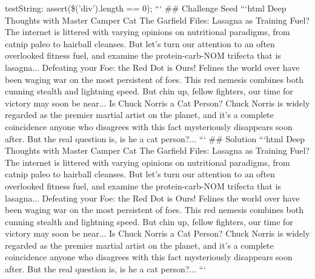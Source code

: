 \documentclass{article}%
\begin{document}
    testString: assert(\$('div').length == 0);\newline%
```\newline%
\#\# Challenge Seed\newline%
```html\newline%
Deep Thoughts with Master Camper Cat\newline%
The Garfield Files: Lasagna as Training Fuel?\newline%
The internet is littered with varying opinions on nutritional paradigms, from catnip paleo to hairball cleanses. But let's turn our attention to an often overlooked fitness fuel, and examine the protein{-}carb{-}NOM trifecta that is lasagna...\newline%
Defeating your Foe: the Red Dot is Ours!\newline%
Felines the world over have been waging war on the most persistent of foes. This red nemesis combines both cunning stealth and lightning speed. But chin up, fellow fighters, our time for victory may soon be near...\newline%
Is Chuck Norris a Cat Person?\newline%
Chuck Norris is widely regarded as the premier martial artist on the planet, and it's a complete coincidence anyone who disagrees with this fact mysteriously disappears soon after. But the real question is, is he a cat person?...\newline%
```\newline%
\newline%
\#\# Solution\newline%
```html\newline%
Deep Thoughts with Master Camper Cat\newline%
The Garfield Files: Lasagna as Training Fuel?\newline%
The internet is littered with varying opinions on nutritional paradigms, from catnip paleo to hairball cleanses. But let's turn our attention to an often overlooked fitness fuel, and examine the protein{-}carb{-}NOM trifecta that is lasagna...\newline%
Defeating your Foe: the Red Dot is Ours!\newline%
Felines the world over have been waging war on the most persistent of foes. This red nemesis combines both cunning stealth and lightning speed. But chin up, fellow fighters, our time for victory may soon be near...\newline%
Is Chuck Norris a Cat Person?\newline%
Chuck Norris is widely regarded as the premier martial artist on the planet, and it's a complete coincidence anyone who disagrees with this fact mysteriously disappears soon after. But the real question is, is he a cat person?...\newline%
```\newline%
\end{document}
